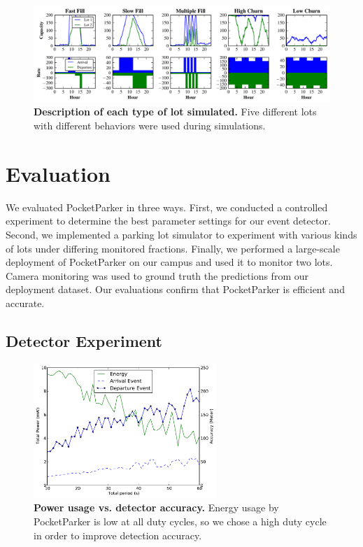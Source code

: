 \begin{figure}[t]
\centering
\includegraphics[width=\textwidth]{./simulator/figures/lots.pdf}

\caption{\textbf{Description of each type of lot simulated.} Five different
lots with different behaviors were used during simulations.}

\label{fig-lotsdescription}
\end{figure}

\section{Evaluation}
\label{sec-evaluation}

We evaluated PocketParker in three ways. First, we conducted a controlled
experiment to determine the best parameter settings for our event detector.
Second, we implemented a parking lot simulator to experiment with various
kinds of lots under differing monitored fractions. Finally, we performed a
large-scale deployment of PocketParker on our campus and used it to monitor
two lots. Camera monitoring was used to ground truth the predictions from
our deployment dataset. Our evaluations confirm that PocketParker is
efficient and accurate.

\subsection{Detector Experiment}

\begin{figure}[t]
\centering
\includegraphics[height=2in,width=\columnwidth]{./figures/Energy_accuracy.pdf}

\caption{\textbf{Power usage vs. detector accuracy.} Energy usage by
PocketParker is low at all duty cycles, so we chose a high duty cycle in
order to improve detection accuracy.}

\label{fig-energy}
\end{figure}

